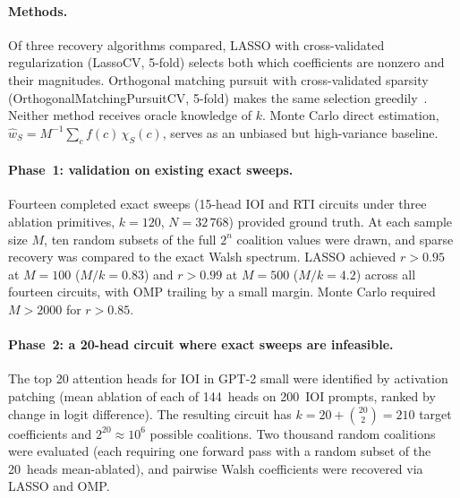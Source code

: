 \documentclass{article}
\begin{document}
\paragraph{Methods.}

Of three recovery algorithms compared, LASSO with cross-validated regularization (LassoCV, 5-fold) selects both which coefficients are nonzero
and their magnitudes. Orthogonal matching pursuit with cross-validated
sparsity (OrthogonalMatchingPursuitCV, 5-fold) makes the same selection
greedily~\citep{tropp2007signal}. Neither method receives oracle
knowledge of $k$. Monte Carlo
direct estimation, $\hat{w}_S = M^{-1} \sum_c f(c)\, \chi_S(c)$, serves as
an unbiased but high-variance baseline.

\paragraph{Phase~1: validation on existing exact sweeps.}

Fourteen completed exact sweeps (15-head IOI and RTI circuits under three
ablation primitives, $k = 120$, $N = 32\,768$) provided ground truth. At
each sample size $M$, ten random subsets of the full $2^n$ coalition values
were drawn, and sparse recovery was compared to the exact Walsh spectrum.
LASSO achieved $r > 0.95$ at $M = 100$ ($M/k = 0.83$) and $r > 0.99$ at
$M = 500$ ($M/k = 4.2$) across all fourteen circuits, with OMP trailing by
a small margin. Monte Carlo required $M > 2000$ for $r > 0.85$.

\paragraph{Phase~2: a 20-head circuit where exact sweeps are infeasible.}

The top 20 attention heads for IOI in GPT-2 small were identified by
activation patching (mean ablation of each of 144~heads on 200~IOI prompts,
ranked by change in logit difference). The resulting circuit has
$k = 20 + \binom{20}{2} = 210$ target coefficients and $2^{20} \approx 10^6$
possible coalitions. Two thousand random coalitions were evaluated (each
requiring one forward pass with a random subset of the 20~heads mean-ablated),
and pairwise Walsh coefficients were recovered via LASSO and OMP.

\medskip
\end{document}
